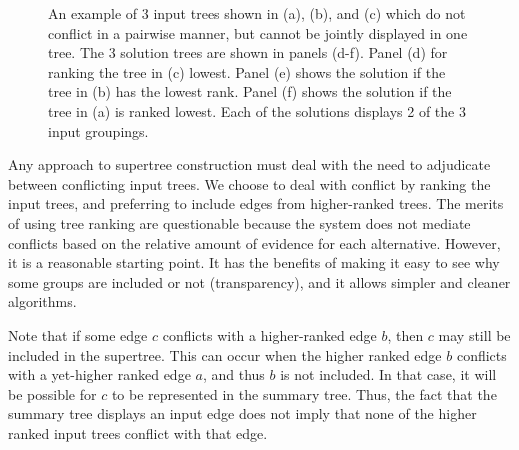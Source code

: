 \documentclass[fleqn,12pt,lineno,english]{wlpeerj}
\begin{document}
\begin{figure}
\hfill{}\hfill{}

\hfill{}\hfill{}

\caption{An example of 3 input trees shown in (a), (b), and (c) which do not
conflict in a pairwise manner, but cannot be jointly displayed in
one tree. The 3 solution trees are shown in panels (d-f). Panel (d)
for ranking the tree in (c) lowest. Panel (e) shows the solution if
the tree in (b) has the lowest rank. Panel (f) shows the solution
if the tree in (a) is ranked lowest. Each of the solutions displays
2 of the 3 input groupings. }

\label{fig:pairwisecompat}
\end{figure}

Any approach to supertree construction must deal with the need to
adjudicate between conflicting input trees. We choose to deal with
conflict by ranking the input trees, and preferring to include edges
from higher-ranked trees. The merits of using tree ranking are questionable
because the system does not mediate conflicts based on the relative
amount of evidence for each alternative. However, it is a reasonable
starting point. It has the benefits of making it easy to see why some
groups are included or not (transparency), and it allows simpler and
cleaner algorithms.

Note that if some edge $c$ conflicts with a higher-ranked edge $b$,
then $c$ may still be included in the supertree. This can occur when
the higher ranked edge $b$ conflicts with a yet-higher ranked edge
$a$, and thus $b$ is not included. In that case, it will be possible
for $c$ to be represented in the summary tree. Thus, the fact that
the summary tree displays an input edge does not imply that none of
the higher ranked input trees conflict with that edge. 
\end{document}
